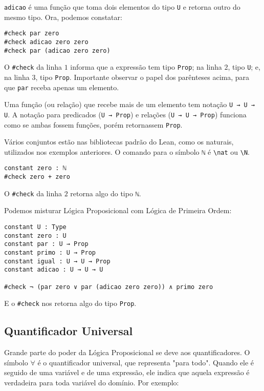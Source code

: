         \lstinline{adicao} é uma função que toma dois elementos do tipo \lstinline{U} e retorna outro do mesmo tipo. Ora, podemos constatar:

        \begin{lstlisting}
#check par zero
#check adicao zero zero
#check par (adicao zero zero)
\end{lstlisting}

        O \lstinline{#check} da linha $1$ informa que a expressão tem tipo \lstinline{Prop}; na linha $2$, tipo \lstinline{U}; e, na linha $3$, tipo \lstinline{Prop}. Importante observar o papel dos parênteses acima, para que \lstinline{par} receba apenas um elemento.

        Uma função (ou relação) que recebe mais de um elemento tem notação \lstinline{U → U → U}. A notação para predicados (\lstinline{U → Prop}) e relações (\lstinline{U → U → Prop}) funciona como se ambas fossem funções, porém retornassem \lstinline{Prop}. 

        Vários conjuntos estão nas bibliotecas padrão do Lean, como os naturais, utilizados nos exemplos anteriores. O comando para o símbolo \lstinline{ℕ} é \lstinline{\nat} ou \lstinline{\N}.

        \begin{lstlisting}
constant zero : ℕ
#check zero + zero
\end{lstlisting}

        O \lstinline{#check} da linha $2$ retorna algo do tipo \lstinline{ℕ}.

        Podemos misturar Lógica Proposicional com Lógica de Primeira Ordem:

        \begin{lstlisting}
constant U : Type
constant zero : U
constant par : U → Prop
constant primo : U → Prop
constant igual : U → U → Prop
constant adicao : U → U → U

#check ¬ (par zero ∨ par (adicao zero zero)) ∧ primo zero
\end{lstlisting}

        E o \lstinline{#check} nos retorna algo do tipo \lstinline{Prop}.

    \subsection{Quantificador Universal}

        Grande parte do poder da Lógica Proposicional se deve aos quantificadores.
        O símbolo $\forall$ é o quantificador universal, que representa "para todo".
        Quando ele é seguido de uma variável e de uma expressão, ele indica que aquela expressão é verdadeira para toda variável do domínio.
        Por exemplo:

